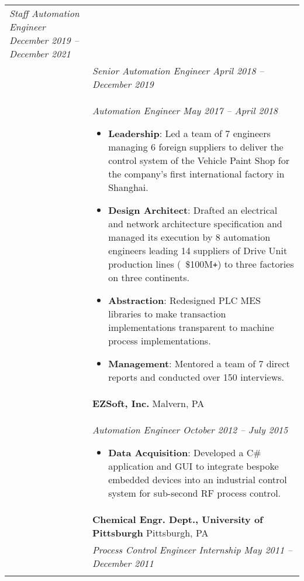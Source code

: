 \documentclass[11pt]{article}
\begin{document}
\begin{tabular}[t]{@{}p{1.00in}@{} @{}p{6.00in}@{}}
    \textit{Staff Automation Engineer \hfill December 2019 -- December 2021}
\\ &
 
    \textit{Senior Automation Engineer \hfill April 2018 -- December 2019}
\\ &
 
    \textit{Automation Engineer \hfill May 2017 -- April 2018}
        \begin{itemize}[noitemsep,topsep=0pt]
            \item \textbf{Leadership}: Led a team of 7 engineers managing 6 foreign suppliers to deliver the control system of the Vehicle Paint Shop for the company's first international factory in Shanghai.%
            \item \textbf{Design Architect}: Drafted an electrical and network architecture specification and managed its execution by 8 automation engineers leading 14 suppliers of Drive Unit production lines (~\$100M\verb!+!) to three factories on three continents.%
            \item \textbf{Abstraction}: Redesigned PLC MES libraries to make transaction implementations transparent to machine process implementations.%
            \item \textbf{Management}: Mentored a team of 7 direct reports and conducted over 150 interviews.%
        \end{itemize}
\\
&
\textbf{EZSoft, Inc.}  \hfill Malvern, PA \\ &
 
    \textit{Automation Engineer \hfill October 2012 -- July 2015}
        \begin{itemize}[noitemsep,topsep=0pt]
            \item \textbf{Data Acquisition}: Developed a C\# application and GUI to integrate bespoke embedded devices into an industrial control system for sub-second RF process control.%
        \end{itemize}
\\
&
\textbf{Chemical Engr. Dept., University of Pittsburgh}  \hfill Pittsburgh, PA \\ &
 
    \textit{Process Control Engineer Internship \hfill May 2011 -- December 2011}
\\
\\


\end{tabular}
\end{document}
